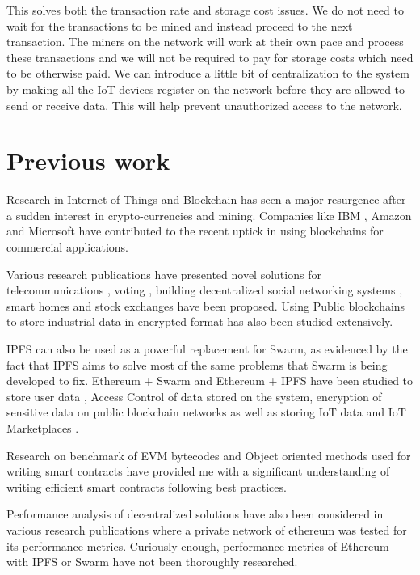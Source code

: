 \documentclass[11pt,openright]{report}
\begin{document}
This solves both the transaction rate and storage cost issues. We do not need to wait for the transactions to be mined and instead proceed to the next transaction. The miners on the network will work at their own pace and process these transactions and we will not be required to pay for storage costs which need to be otherwise paid. We can introduce a little bit of centralization to the system by making all the IoT devices register on the network before they are allowed to send or receive data. This will help prevent unauthorized access to the network.

\section{Previous work}\label{section:previouswork}
Research in Internet of Things and Blockchain has seen a major resurgence after a sudden interest in crypto-currencies and mining. Companies like IBM \cite{Androulaki:2018:HFD:3190508.3190538}, Amazon and Microsoft have contributed to the recent uptick in using blockchains for commercial applications. 

Various research publications have presented novel solutions for telecommunications \cite{8441204}, voting \cite{8603050}, building decentralized social networking systems \cite{8645058}, smart homes\cite{8644880} and stock exchanges \cite{8516610} have been proposed. Using Public blockchains to store industrial data in encrypted format has also been studied extensively\cite{8622246}.

IPFS can also be used as a powerful replacement for Swarm, as evidenced by the fact that IPFS aims to solve most of the same problems that Swarm is being developed to fix. Ethereum + Swarm and Ethereum + IPFS have been studied to store user data \cite{8448350}, Access Control of data \cite{8400511} stored on the system, encryption of sensitive data on public blockchain networks \cite{8400511} as well as storing IoT data \cite{8634961} and IoT Marketplaces \cite{8525388}.

Research on benchmark of EVM bytecodes \cite{8612882} and Object oriented methods used for writing smart contracts \cite{8445056} have provided me with a significant understanding of writing efficient smart contracts following best practices. 

Performance analysis of decentralized solutions have also been considered in various research publications \cite{8342866} where a private network of ethereum was tested for its performance metrics. Curiously enough, performance metrics of Ethereum with IPFS or Swarm have not been thoroughly researched. 
\end{document}

